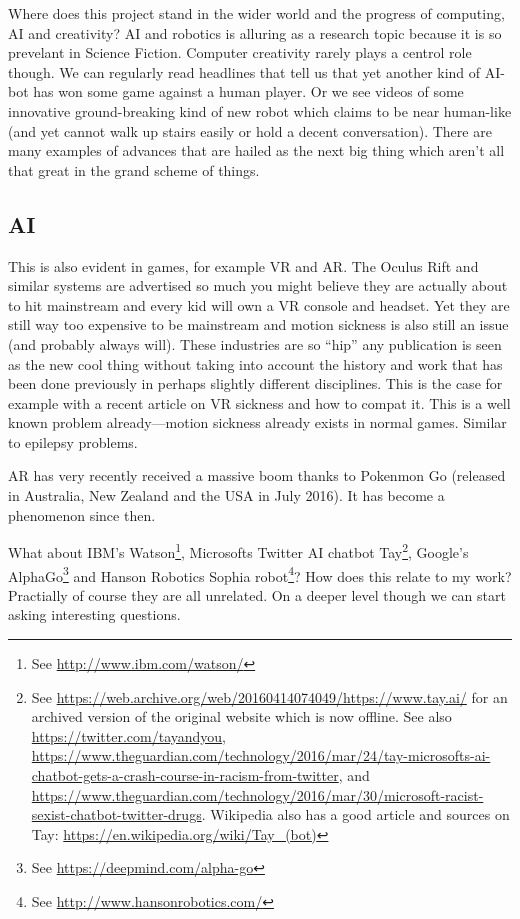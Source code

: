 Where does this project stand in the wider world and the progress of computing, \ac{AI} and creativity? \ac{AI} and robotics is alluring as a research topic because it is so prevelant in Science Fiction. Computer creativity rarely plays a centrol role though. We can regularly read headlines that tell us that yet another kind of \ac{AI}-bot has won some game against a human player. Or we see videos of some innovative ground-breaking kind of new robot which claims to be near human-like (and yet cannot walk up stairs easily or hold a decent conversation). There are many examples of advances that are hailed as the next big thing which aren't all that great in the grand scheme of things. 

\subsection{AI}
This is also evident in games, for example \ac{VR} and \ac{AR}. The Oculus Rift and similar systems are advertised so much you might believe they are actually about to hit mainstream and every kid will own a \ac{VR} console and headset. Yet they are still way too expensive to be mainstream and motion sickness is also still an issue (and probably always will). These industries are so ``hip'' any publication is seen as the new cool thing without taking into account the history and work that has been done previously in perhaps slightly different disciplines. This is the case for example with a recent article on \ac{VR} sickness and how to compat it. This is a well known problem already---motion sickness already exists in normal games. Similar to epilepsy problems.


\ac{AR} has very recently received a massive boom thanks to Pokenmon Go (released in Australia, New Zealand and the USA in July 2016). It has become a phenomenon since then.

What about IBM's Watson\footnote{See \url{http://www.ibm.com/watson/}}, Microsofts Twitter \ac{AI} chatbot Tay\footnote{See \url{https://web.archive.org/web/20160414074049/https://www.tay.ai/} for an archived version of the original website which is now offline. See also \url{https://twitter.com/tayandyou}, \url{https://www.theguardian.com/technology/2016/mar/24/tay-microsofts-ai-chatbot-gets-a-crash-course-in-racism-from-twitter}, and \url{https://www.theguardian.com/technology/2016/mar/30/microsoft-racist-sexist-chatbot-twitter-drugs}. Wikipedia also has a good article and sources on Tay: \url{https://en.wikipedia.org/wiki/Tay_(bot)}}, Google's AlphaGo\footnote{See \url{https://deepmind.com/alpha-go}} and Hanson Robotics Sophia robot\footnote{See \url{http://www.hansonrobotics.com/}}? How does this relate to my work? Practially of course they are all unrelated. On a deeper level though we can start asking interesting questions. 

